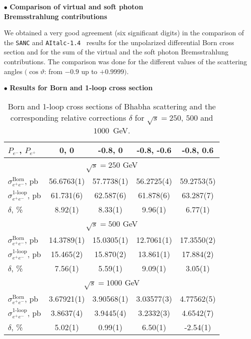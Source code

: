 \documentclass[%
 reprint,
amsmath,
amssymb,
 aps,
 prb,
 floatfix,
]{revtex4-1}
\begin{document}
$\bullet$ {\bf  Comparison of virtual and soft photon\\ Bremsstrahlung contributions}

We obtained a very good agreement (six significant digits) in the comparison 
of the {\tt SANC} and {\tt AItalc-1.4}~\cite{Fleischer:2006ht} results for 
the unpolarized differential Born cross section and for the sum of 
the virtual and the soft photon Bremsstrahlung contributions. 
The comparison was done for the different values of the
scattering angles $(\cos \vartheta$: from $-0.9$ up to $+0.9999)$.

$\bullet$ {\bf Results for Born and 1-loop cross section}

\begin{table}[!ht]
\caption{Born and 1-loop cross sections of Bhabha scattering and the corresponding 
relative corrections $\delta$ for $\sqrt{s} = 250$, $500$ and $1000$~GeV.}
\label{Table:sanc_delta}
\begin{ruledtabular}
\begin{tabular}{lcccc}
$P_{e^-}$, $P_{e^+}$ & 0, 0 & -0.8, 0 & -0.8, -0.6 & -0.8, 0.6\\
\hline
\multicolumn{5}{c}{$\sqrt{s} = 250$ GeV}\\
\hline
$\sigma_{e^+e^-}^{\text{Born}}$, pb & 56.6763(1) & 57.7738(1) & 56.2725(4) & 59.2753(5)\\
$\sigma_{e^+e^-}^{\text{1-loop}}$, pb & 61.731(6) & 62.587(6) & 61.878(6) & 63.287(7)\\
$\delta$, \% & 8.92(1) & 8.33(1) & 9.96(1) & 6.77(1) \\
\hline
\multicolumn{5}{c}{$\sqrt{s} = 500$ GeV}\\
\hline
$\sigma_{e^+e^-}^{\text{Born}}$, pb & 14.3789(1) & 15.0305(1) & 12.7061(1) & 17.3550(2)\\
$\sigma_{e^+e^-}^{\text{1-loop}}$, pb & 15.465(2) & 15.870(2) & 13.861(1) & 17.884(2)\\
$\delta$, \% & 7.56(1) & 5.59(1) & 9.09(1) & 3.05(1)\\
\hline
\multicolumn{5}{c}{$\sqrt{s} = 1000$ GeV}\\
\hline
$\sigma_{e^+e^-}^{\text{Born}}$, pb & 3.67921(1) & 3.90568(1) & 3.03577(3) & 4.77562(5)\\
$\sigma_{e^+e^-}^{\text{1-loop}}$, pb & 3.8637(4) & 3.9445(4) & 3.2332(3) & 4.6542(7)\\
$\delta$, \% & 5.02(1) & 0.99(1) & 6.50(1) & -2.54(1)\\
\end{tabular}
\end{ruledtabular}
\end{table}
\end{document}
